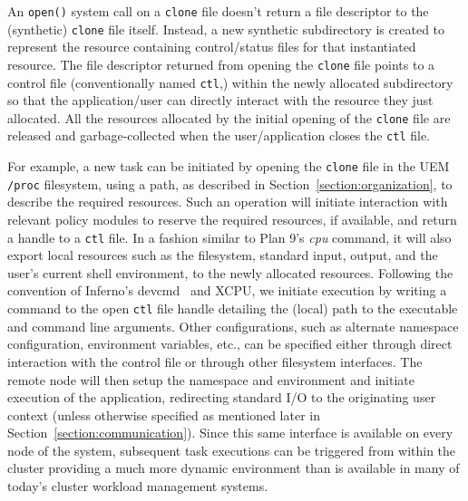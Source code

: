 \documentclass{sig-alternate}
\begin{document}
An {\tt open()} system call on a {\tt clone}
file doesn't return a file descriptor to the (synthetic) {\tt clone} file itself.  
Instead, a new synthetic subdirectory is created to represent the resource
containing control/status files for that instantiated resource.
The file descriptor returned from opening the {\tt clone} file points to a 
control file (conventionally named {\tt ctl},) within the newly allocated subdirectory so that the 
application/user can directly interact with the resource they just 
allocated.  All the resources allocated by the initial opening of the
{\tt clone} file are
released and garbage-collected when the user/application closes the {\tt ctl} 
file. 

For example, a new task can be initiated by opening the {\tt clone}
file in the UEM {\tt /proc} filesystem, using a path, as described
in Section~\ref{section:organization}, to describe the required resources.
Such an operation will initiate interaction with relevant policy modules to reserve the required resources,
if available, and return a handle to a {\tt ctl} file. 
In a fashion similar to Plan 9's \emph{cpu} command, it will also 
export local resources such as the filesystem, standard input, output, and 
the user's current shell environment, to the newly allocated resources.
Following the convention of Inferno's devcmd~\cite{inferno:man} and XCPU, we 
initiate execution by writing a command to the open {\tt ctl} file handle 
detailing the (local) path to the executable and command line arguments.
Other configurations, such as alternate namespace configuration, environment
variables, etc., can be specified either through direct interaction with the
control file or through other filesystem interfaces.
The remote node will then setup the namespace and environment and initiate
execution of the application, redirecting standard I/O to the originating 
user context (unless otherwise specified as mentioned later in Section~\ref{section:communication}).  Since this same interface is available on every node of the system,
subsequent task executions can be triggered from within the cluster providing 
a much more dynamic environment than is available in many of today's cluster
workload management systems.
\end{document}
